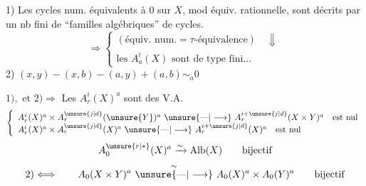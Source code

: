 1) Les cycles num. équivalents à 0 sur $X$, mod équiv. rationnelle, sont décrits par un nb fini de ``familles algébriques'' de cycles.
\[
\Longrightarrow\left\{
\begin{array}{l}
(\text{équiv. num.}=\tau\text{-équivalence})\quad\Downarrow\\
\text{les }A_a^i(X)\text{ sont de type fini}\ldots
\end{array}\right.
\]
2) $(x,y)-(x,b)-(a,y)+(a,b)\sim_a0$

$1),\text{ et }2)\Longrightarrow$ Les $A_r^i(X)^a$ sont des V.A.
\[
\left\{
\begin{array}{l}
A_r^i(X)^a\times A_r^{\unsure{j|d}}(\unsure{Y})^a\ \unsure{\text{---}|\longrightarrow}\ A_r^{i+\unsure{j|d}}(X\times Y)^a\quad\text{est nul}\\
A_r^i(X)^a\times A_r^{\unsure{j|d}}(X)^a\ \unsure{\text{---}|\longrightarrow}\ A_r^{i+\unsure{j|d}}(X)^a\quad\text{est nul}
\end{array}\right.
\]
\[
A_0^{\unsure{r|*}}(X)^a\xrightarrow{\sim}\operatorname{Alb}(X)\qquad\text{bijectif}
\]
\[
2)\Longleftrightarrow\qquad A_0(X\times Y)^a\ \overset{\sim}{\unsure{\text{---}|\longrightarrow}}\ A_0(X)^a\times A_0(Y)^a\qquad\text{bijectif}
\]
